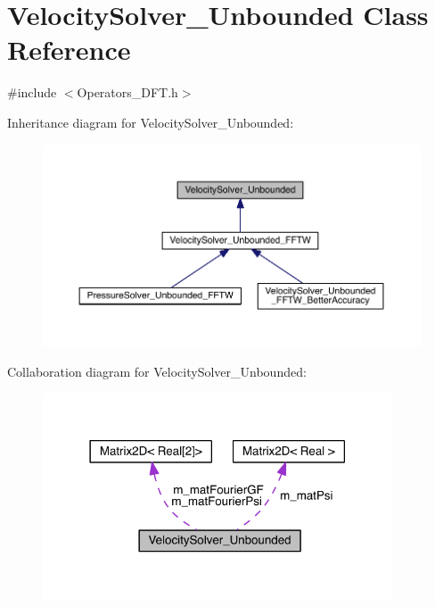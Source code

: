 \hypertarget{class_velocity_solver___unbounded}{}\section{Velocity\+Solver\+\_\+\+Unbounded Class Reference}
\label{class_velocity_solver___unbounded}


{\ttfamily \#include $<$Operators\+\_\+\+D\+F\+T.\+h$>$}



Inheritance diagram for Velocity\+Solver\+\_\+\+Unbounded\+:\nopagebreak
\begin{figure}[H]
\begin{center}
\leavevmode
\includegraphics[width=350pt]{d4/d46/class_velocity_solver___unbounded__inherit__graph}
\end{center}
\end{figure}


Collaboration diagram for Velocity\+Solver\+\_\+\+Unbounded\+:\nopagebreak
\begin{figure}[H]
\begin{center}
\leavevmode
\includegraphics[width=294pt]{d6/d65/class_velocity_solver___unbounded__coll__graph}
\end{center}
\end{figure}
